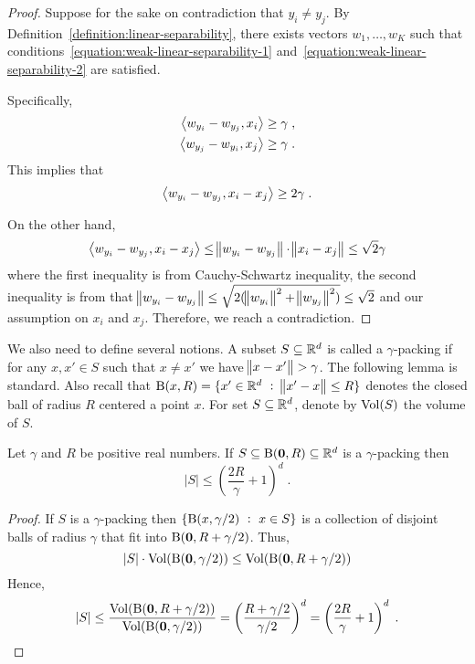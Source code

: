 \begin{proof}
Suppose for the sake on contradiction that $y_i \neq y_j$. By
Definition~\ref{definition:linear-separability}, there exists
vectors $w_1, \ldots, w_K$ such that
conditions~\eqref{equation:weak-linear-separability-1}
and~\eqref{equation:weak-linear-separability-2} are satisfied.

Specifically,
\begin{align*}
\left\langle w_{y_i} - w_{y_j}, x_i \right\rangle & \ge \gamma \; , \\
\left\langle w_{y_j} - w_{y_i}, x_j \right\rangle & \ge \gamma \; .
\end{align*}
This implies that
$$
\left\langle w_{y_i} - w_{y_j}, x_i - x_j \right\rangle \ge 2\gamma \; .
$$

On the other hand,
$$
\left\langle w_{y_i} - w_{y_j}, x_i - x_j \right\rangle \le \norm{w_{y_i} - w_{y_j}} \cdot \norm{x_i - x_j} \le \sqrt{2} \gamma
$$
where the first inequality is from Cauchy-Schwartz inequality, the second
inequality is from that $\norm{w_{y_i} - w_{y_j}} \le \sqrt{2(\norm{w_{y_i}}^2 +
\norm{w_{y_j}}^2)} \leq \sqrt{2}$ and our assumption on $x_i$ and $x_j$.
Therefore, we reach a contradiction.
\end{proof}

We also need to define several notions. A subset $S \subseteq \mathbb{R}^d$ is called a
$\gamma$-packing if for any $x,x' \in S$ such that $x \neq x'$ we have $\norm{x -
x'} > \gamma$. The following lemma is standard. Also recall that $\operatorname{B}(x,R) = \{ x'
\in \mathbb{R}^d ~:~ \norm{x' - x} \le R \}$ denotes the closed ball of radius $R$
centered a point $x$. For set $S \subseteq \mathbb{R}^d$, denote by $\operatorname*{Vol}(S)$ the volume of
$S$.

\begin{lemma}
\label{lemma:size-of-packing}
Let $\gamma$ and $R$ be positive real numbers.
If $S \subseteq \operatorname{B}(\mathbf{0},R) \subseteq \mathbb{R}^d$ is a $\gamma$-packing then
$$
|S| \le \left( \frac{2R}{\gamma} + 1 \right)^d \; .
$$
\end{lemma}

\begin{proof}
If $S$ is a $\gamma$-packing then $\{ \operatorname{B}(x,\gamma/2) ~:~ x \in S \}$
is a collection of disjoint balls of radius $\gamma$ that fit into $\operatorname{B}(\mathbf{0},R + \gamma/2)$.
Thus,
$$
|S| \cdot \operatorname*{Vol}(\operatorname{B}(\mathbf{0}, \gamma/2)) \le \operatorname*{Vol}(\operatorname{B}(\mathbf{0},R + \gamma/2))
$$
Hence,
\begin{align*}
|S|
 \le \frac{\operatorname*{Vol}(\operatorname{B}(\mathbf{0},R + \gamma/2))}{\operatorname*{Vol}(\operatorname{B}(\mathbf{0}, \gamma/2))} 
 = \left( \frac{R + \gamma/2}{\gamma/2} \right)^d
 = \left( \frac{2R}{\gamma} + 1 \right)^d \; .
\end{align*}
\end{proof}

